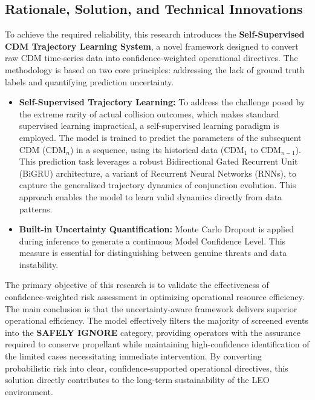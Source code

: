 \documentclass[12pt, a4paper]{article}
\begin{document}
\subsection{Rationale, Solution, and Technical Innovations}

To achieve the required reliability, this research introduces the \textbf{Self-Supervised CDM Trajectory Learning System}, a novel framework designed to convert raw CDM time-series data into confidence-weighted operational directives. The methodology is based on two core principles: addressing the lack of ground truth labels and quantifying prediction uncertainty.

\begin{itemize}
    \item \textbf{Self-Supervised Trajectory Learning:} To address the challenge posed by the extreme rarity of actual collision outcomes, which makes standard supervised learning impractical, a self-supervised learning paradigm is employed. The model is trained to predict the parameters of the subsequent CDM ($\text{CDM}_n$) in a sequence, using its historical data ($\text{CDM}_1$ to $\text{CDM}_{n-1}$). This prediction task leverages a robust Bidirectional Gated Recurrent Unit (BiGRU) architecture, a variant of Recurrent Neural Networks (RNNs), to capture the generalized trajectory dynamics of conjunction evolution. This approach enables the model to learn valid dynamics directly from data patterns.

    \item \textbf{Built-in Uncertainty Quantification:} Monte Carlo Dropout is applied during inference to generate a continuous Model Confidence Level. This measure is essential for distinguishing between genuine threats and data instability.
\end{itemize}

The primary objective of this research is to validate the effectiveness of confidence-weighted risk assessment in optimizing operational resource efficiency. The main conclusion is that the uncertainty-aware framework delivers superior operational efficiency. The model effectively filters the majority of screened events into the \textbf{SAFELY IGNORE} category, providing operators with the assurance required to conserve propellant while maintaining high-confidence identification of the limited cases necessitating immediate intervention. By converting probabilistic risk into clear, confidence-supported operational directives, this solution directly contributes to the long-term sustainability of the LEO environment.
\end{document}
